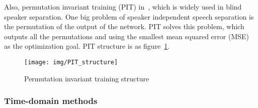 Also, permutation invariant training (PIT) in~\cite{pitch_aware}, which is widely used in blind speaker separation.
One big problem of speaker independent speech separation is the permutation of the output of the network.
PIT solves this problem, which outputs all the permutations and using the smallest mean squared error (MSE) as the optimization goal.
PIT structure is as figure~\ref{fig:PIT_structure}.
\begin{figure}[!htbp]
    \centering
    \texttt{[image: img/PIT\_structure]}
    \caption{Permutation invariant training structure}
    \label{fig:PIT_structure}
\end{figure}

\subsubsection{Time-domain methods}

